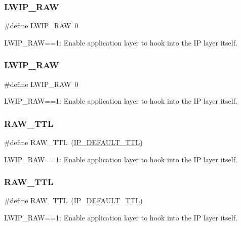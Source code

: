 \subsubsection{\texorpdfstring{L\+W\+I\+P\+\_\+\+R\+AW}{LWIP\_RAW}\hspace{0.1cm}{\footnotesize\ttfamily [1/2]}}
{\footnotesize\ttfamily \#define L\+W\+I\+P\+\_\+\+R\+AW~0}

L\+W\+I\+P\+\_\+\+R\+AW==1\+: Enable application layer to hook into the IP layer itself. \mbox{\label{group__lwip__opts__raw_gaca452be5cb05d9666f8f57e582c39221}} 
\subsubsection{\texorpdfstring{L\+W\+I\+P\+\_\+\+R\+AW}{LWIP\_RAW}\hspace{0.1cm}{\footnotesize\ttfamily [2/2]}}
{\footnotesize\ttfamily \#define L\+W\+I\+P\+\_\+\+R\+AW~0}

L\+W\+I\+P\+\_\+\+R\+AW==1\+: Enable application layer to hook into the IP layer itself. \mbox{\label{group__lwip__opts__raw_ga36e3ffa66073ca0d27d11c422778249c}} 
\subsubsection{\texorpdfstring{R\+A\+W\+\_\+\+T\+TL}{RAW\_TTL}\hspace{0.1cm}{\footnotesize\ttfamily [1/2]}}
{\footnotesize\ttfamily \#define R\+A\+W\+\_\+\+T\+TL~(\hyperlink{group__lwip__opts__ipv4_ga556b9b58fd02c0fdd126791baef77411}{I\+P\+\_\+\+D\+E\+F\+A\+U\+L\+T\+\_\+\+T\+TL})}

L\+W\+I\+P\+\_\+\+R\+AW==1\+: Enable application layer to hook into the IP layer itself. \mbox{\label{group__lwip__opts__raw_ga36e3ffa66073ca0d27d11c422778249c}} 
\subsubsection{\texorpdfstring{R\+A\+W\+\_\+\+T\+TL}{RAW\_TTL}\hspace{0.1cm}{\footnotesize\ttfamily [2/2]}}
{\footnotesize\ttfamily \#define R\+A\+W\+\_\+\+T\+TL~(\hyperlink{group__lwip__opts__ipv4_ga556b9b58fd02c0fdd126791baef77411}{I\+P\+\_\+\+D\+E\+F\+A\+U\+L\+T\+\_\+\+T\+TL})}

L\+W\+I\+P\+\_\+\+R\+AW==1\+: Enable application layer to hook into the IP layer itself. 